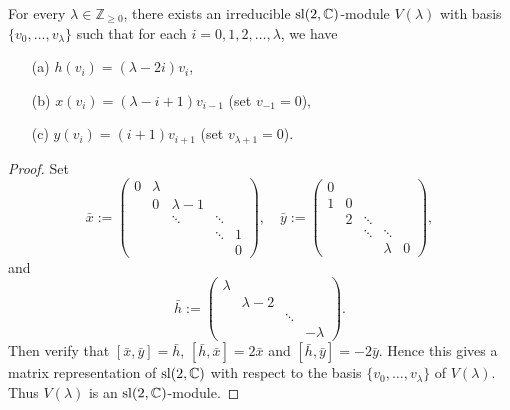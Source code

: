 \begin{thm}
    For every $\lambda\in\mathbb{Z}_{\geq 0}$, there exists an irreducible $\sl(2,\mathbb{C})$-module $V(\lambda)$ with basis $\{v_0,\ldots,v_\lambda\}$ such that for each $i=0,1,2,\ldots,\lambda$, we have
    \begin{enumerate}
        \item[(a)] $h(v_i)=(\lambda-2i)v_i$,
        \item[(b)] $x(v_i)=(\lambda-i+1)v_{i-1}$ (set $v_{-1}=0$),
        \item[(c)] $y(v_i)=(i+1)v_{i+1}$ (set $v_{\lambda+1}=0$).
    \end{enumerate}
\end{thm}

\begin{proof}
    Set
    \[
        \bar{x}:=
        \left(
        \begin{array}{ccccc}
                0 & \lambda                          \\
                & 0       & \lambda-1              \\
                &         & \ddots    & \ddots     \\
                &         &           & \ddots & 1 \\
                &         &           &        & 0
            \end{array}
        \right),\quad \bar{y}:=
        \left(
        \begin{array}{ccccc}
                0 &                           \\
                1 & 0       &             \\
                &  2       &  \ddots   &      \\
                &         &      \ddots     & \ddots &  \\
                &         &           &    \lambda    & 0
            \end{array}
        \right),
    \]
    and
    \[
        \bar{h}:=
        \left(
        \begin{array}{cccc}
                \lambda                          \\
                & \lambda-2                     \\
                &           & \ddots            \\
                &           &        & -\lambda
            \end{array}
        \right).
    \]
    Then verify that $[\bar{x},\bar{y}]=\bar{h}$, $[\bar{h},\bar{x}]=2\bar{x}$ and $[\bar{h},\bar{y}]=-2\bar{y}$. Hence this gives a matrix representation of $\sl(2,\mathbb{C})$ with respect to the basis $\{v_0,\ldots,v_\lambda\}$ of $V(\lambda)$. Thus $V(\lambda)$ is an $\sl(2,\mathbb{C})$-module.


\end{proof}
